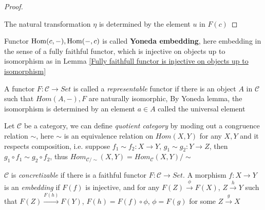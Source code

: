 \documentclass[main]{subfiles}
\begin{document}
\begin{proof}\hfill \\
\begin{center}
\end{center}
The natural transformation $\eta$ is determined by the element $u$ in $F(c)$
\end{proof}

\begin{remark}
Functor $\operatorname{Hom}(c,-), \operatorname{Hom}(-,c)$ is called \textbf{Yoneda embedding}, here embedding in the sense of a fully faithful functor, which is injective on objects up to isomorphism as in Lemma \ref{Fully faithfull functor is injective on objects up to isomorphism}
\end{remark}

\begin{definition}
A functor $F:\mathscr C\to Set$ is called a \textit{representable} functor if there is an object $A$ in $\mathscr C$ such that $Hom(A,-), F$ are naturally isomorphic, By Yoneda lemma, the isomorphism is determined by an element $a\in A$ called the universal element
\end{definition}

\begin{definition}
Let $\mathscr C$ be a category, we can define \textit{quotient category} by moding out a congruence relation $\sim$, here $\sim$ is an equivalence relation on $Hom(X,Y)$ for any $X,Y$ and it respects composition, i.e. suppose $f_1\sim f_2:X\to Y$, $g_1\sim g_2:Y\to Z$, then $g_1\circ f_1\sim g_2\circ f_2$, thus $Hom_{\mathscr C/\sim}(X,Y)=Hom_{\mathscr C}(X,Y)/\sim$
\end{definition}

\begin{definition}
$\mathscr C$ is \textit{concretizable} if there is a faithful functor $F:\mathscr C\to Set$. A morphism $f:X\to Y$ is an \textit{embedding} if $F(f)$ is injective, and for any $F(Z)\xrightarrow{\phi} F(X)$, $Z\xrightarrow{h} Y$ such that $F(Z)\xrightarrow{F(h)} F(Y)$, $F(h)=F(f)\circ\phi$,  $\phi=F(g)$ for some $Z\xrightarrow{g} X$
\end{definition}
\end{document}
